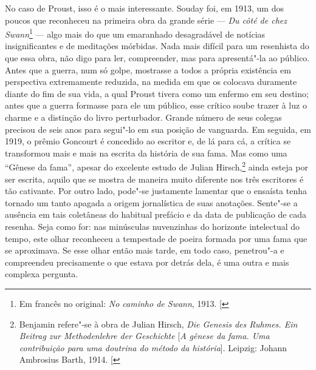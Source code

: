 No caso de Proust, isso é o mais interessante. Souday foi, em 1913, um
dos poucos que reconheceu na primeira obra da grande série --- \emph{Du côté de chez Swann}\footnote{Em francês no original: \emph{No
caminho de Swann}, 1913. {[}\versal{N.~T.}{]}} --- algo mais do que um emaranhado desagradável de
notícias insignificantes e de meditações mórbidas. Nada mais difícil
para um resenhista do que essa obra, não digo para ler, compreender, mas
para apresentá"-la ao público. Antes que a guerra, num só golpe,
mostrasse a todos a própria existência em perspectiva extremamente
reduzida, na medida em que os colocava duramente diante do fim de sua
vida, a qual Proust tivera como um enfermo em seu destino; antes que a
guerra formasse para ele um público, esse crítico soube trazer à luz o
charme e a distinção do livro perturbador. Grande número de seus colegas
precisou de seis anos para segui"-lo em sua posição de vanguarda. Em
seguida, em 1919, o prêmio Goncourt é concedido ao escritor e, de lá
para cá, a crítica se transformou mais e mais na escrita da história de
sua fama. Mas como uma ``Gênese da fama'', apesar do excelente estudo de
Julian Hirsch,\footnote{Benjamin refere"-se à obra de Julian Hirsch,
  \emph{Die Genesis des Ruhmes. Ein Beitrag zur Methodenlehre der
  Geschichte} {[}\emph{A gênese da fama. Uma contribuição para uma
  doutrina do método da história}{]}. Leipzig: Johann Ambrosius Barth,
  1914. {[}\versal{N. E.}{]}} ainda esteja por ser escrita, aquilo que se mostra
de maneira muito diferente nos três escritores é tão cativante. Por
outro lado, pode"-se justamente lamentar que o ensaísta tenha tornado um
tanto apagada a origem jornalística de suas anotações. Sente"-se a
ausência em tais coletâneas do habitual prefácio e da data de publicação
de cada resenha. Seja como for: nas minúsculas nuvenzinhas do horizonte
intelectual do tempo, este olhar reconheceu a tempestade de poeira
formada por uma fama que se aproximava. Se esse olhar então mais tarde,
em todo caso, penetrou"-a e compreendeu precisamente o que estava por
detrás dela, é uma outra e mais complexa pergunta.


